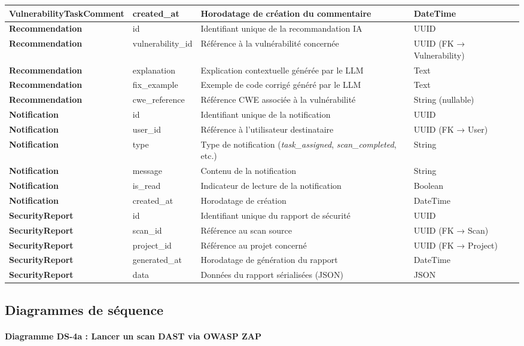 \begin{table}[H]
\begin{tabularx}{\textwidth}{>{\bfseries}p{2.8cm} p{3.2cm} X p{2.5cm}}
VulnerabilityTaskComment & created\_at & Horodatage de création du commentaire & DateTime \\
\hline
Recommendation & id & Identifiant unique de la recommandation IA & UUID \\
Recommendation & vulnerability\_id & Référence à la vulnérabilité concernée & UUID (FK → Vulnerability) \\
Recommendation & explanation & Explication contextuelle générée par le LLM & Text \\
Recommendation & fix\_example & Exemple de code corrigé généré par le LLM & Text \\
Recommendation & cwe\_reference & Référence CWE associée à la vulnérabilité & String (nullable) \\
\hline
Notification & id & Identifiant unique de la notification & UUID \\
Notification & user\_id & Référence à l'utilisateur destinataire & UUID (FK → User) \\
Notification & type & Type de notification (\textit{task\_assigned}, \textit{scan\_completed}, etc.) & String \\
Notification & message & Contenu de la notification & String \\
Notification & is\_read & Indicateur de lecture de la notification & Boolean \\
Notification & created\_at & Horodatage de création & DateTime \\
\hline
SecurityReport & id & Identifiant unique du rapport de sécurité & UUID \\
SecurityReport & scan\_id & Référence au scan source & UUID (FK → Scan) \\
SecurityReport & project\_id & Référence au projet concerné & UUID (FK → Project) \\
SecurityReport & generated\_at & Horodatage de génération du rapport & DateTime \\
SecurityReport & data & Données du rapport sérialisées (JSON) & JSON \\
\hline
\end{tabularx}
\end{table}

\subsection{Diagrammes de séquence}

\paragraph{Diagramme DS-4a : Lancer un scan DAST via OWASP ZAP}

